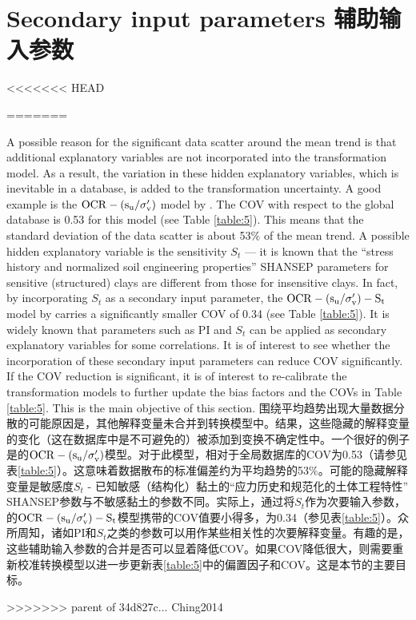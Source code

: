 \section{Secondary input parameters 辅助输入参数}

<<<<<<< HEAD
\begin{paracol}{2}
=======
\begin{Parallel}{0.60\textwidth}{}
    \ParallelLText
    {
        A possible reason for the significant data scatter around the mean trend is that additional explanatory variables are not incorporated into the transformation model. As a result, the variation in these hidden explanatory variables, which is inevitable in a database, is added to the transformation uncertainty. A good example is the $\rm{OCR}-(s_u/\sigma_v')$ model by \citet{Jamiolkowski198557}. The COV with respect to the global database is 0.53 for this model (see Table \ref{table:5}). This means that the standard deviation of the data scatter is about 53$\%$ of the mean trend. A possible hidden explanatory variable is the sensitivity $S_t$ — it is known that the “stress history and normalized soil engineering properties” SHANSEP parameters for sensitive (structured) clays are different from those for insensitive clays. In fact, by incorporating $S_t$ as a secondary input parameter, the $\rm{OCR}-(s_u/\sigma_v')-S_t$ model by \cite{Ching2012522}carries a significantly smaller COV of 0.34 (see Table \ref{table:5}). It is widely known that parameters such as PI and $S_t$ can be applied as secondary explanatory variables for some correlations. It is of interest to see whether the incorporation of these secondary input parameters can reduce COV significantly. If the COV reduction is significant, it is of interest to re-calibrate the transformation models to further update the bias factors and the COVs in Table \ref{table:5}. This is the main objective of this section.
    }
    \ParallelRText
    {
        围绕平均趋势出现大量数据分散的可能原因是，其他解释变量未合并到转换模型中。结果，这些隐藏的解释变量的变化（这在数据库中是不可避免的）被添加到变换不确定性中。一个很好的例子是\citet{Jamiolkowski198557}的$\rm{OCR}-(s_u/\sigma_v')$模型。对于此模型，相对于全局数据库的COV为0.53（请参见表\ref{table:5}）。这意味着数据散布的标准偏差约为平均趋势的53$\%$。可能的隐藏解释变量是敏感度$S_t$ - 已知敏感（结构化）黏土的“应力历史和规范化的土体工程特性” SHANSEP参数与不敏感黏土的参数不同。实际上，通过将$S_t$作为次要输入参数，\cite{Ching2012522}的$\rm{OCR}-(s_u/\sigma_v')-S_t$模型携带的COV值要小得多，为0.34（参见表\ref{table:5}）。众所周知，诸如PI和$S_t$之类的参数可以用作某些相关性的次要解释变量。有趣的是，这些辅助输入参数的合并是否可以显着降低COV。如果COV降低很大，则需要重新校准转换模型以进一步更新表\ref{table:5}中的偏置因子和COV。这是本节的主要目标。
    }
\end{Parallel}
>>>>>>> parent of 34d827c... Ching2014


\end{paracol}
